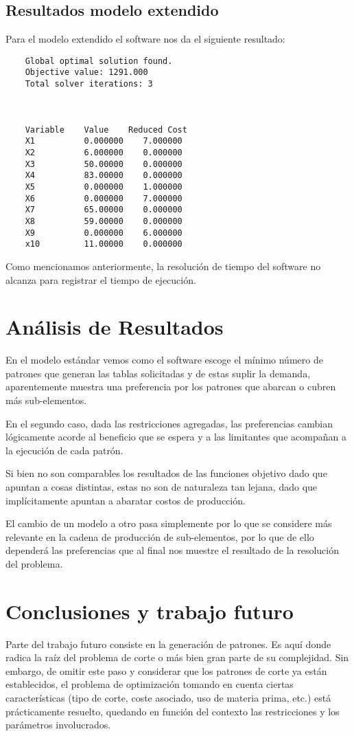\documentclass[journal, 10pt]{IEEEtran}
\begin{document}
	\subsection{Resultados modelo extendido}
		Para el modelo extendido el software nos da el siguiente resultado:
		\begin{verbatim}
    Global optimal solution found.
    Objective value: 1291.000
    Total solver iterations: 3
    
    
    
    Variable    Value    Reduced Cost
    X1          0.000000    7.000000
    X2          6.000000    0.000000
    X3          50.00000    0.000000
    X4          83.00000    0.000000
    X5          0.000000    1.000000
    X6          0.000000    7.000000
    X7          65.00000    0.000000
    X8          59.00000    0.000000
    X9          0.000000    6.000000
    x10         11.00000    0.000000
		\end{verbatim}
		Como mencionamos anteriormente, la resolución de tiempo del
		software no alcanza para registrar el tiempo de ejecución.
		
\section{Análisis de Resultados}
	En el modelo estándar vemos como el software escoge el mínimo
	número de patrones que generan las tablas solicitadas y de estas
	suplir la demanda, aparentemente muestra una preferencia por los
	patrones que abarcan o cubren más sub-elementos. 
	
	En el segundo caso, dada las restricciones agregadas, las preferencias
	cambian lógicamente acorde al beneficio que se espera y a las limitantes
	que acompañan a la ejecución de cada patrón.
	
	Si bien no son comparables los resultados de las funciones objetivo dado
	que apuntan a cosas distintas, estas no son de naturaleza tan lejana, dado
	que implícitamente apuntan a abaratar costos de producción.
	
	El cambio de un modelo a otro pasa simplemente por lo que se considere más
	relevante en la cadena de producción de sub-elementos, por lo que de ello 
	dependerá las preferencias que al final nos muestre el resultado de la
	resolución del problema.

\section{Conclusiones y trabajo futuro}
	Parte del trabajo futuro consiste en la generación de patrones. Es aquí
	donde radica la raíz del problema de corte o más bien gran parte de su 
	complejidad. Sin embargo, de omitir este paso y considerar que los patrones 
	de corte ya están establecidos, el problema de optimización 
	tomando en cuenta ciertas características (tipo de corte, coste asociado, 
	uso de materia prima, etc.) está prácticamente resuelto, quedando en función 
	del contexto las restricciones y los parámetros involucrados.
	
\end{document}
